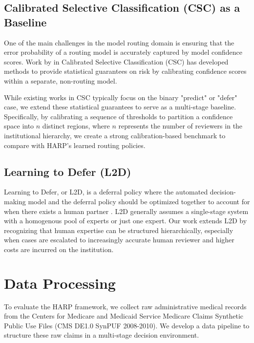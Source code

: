 \documentclass[conference]{IEEEtran}
\begin{document}
\subsection{Calibrated Selective Classification (CSC) as a Baseline}

One of the main challenges in the model routing domain is ensuring that the error probability of a routing model is
accurately captured by model confidence scores. Work by \cite{fisch2024,angelopoulos2022} in Calibrated Selective Classification (CSC)
has developed methods to provide statistical guarantees on risk by calibrating confidence scores within a separate,
non-routing model.

While existing works in CSC typically focus on the binary "predict" or "defer" case, we extend these statistical
guarantees to serve as a multi-stage baseline. Specifically, by calibrating a sequence of thresholds to partition 
a confidence space into $n$ distinct regions, where $n$ represents the number of reviewers in the institutional hierarchy,
we create a strong calibration-based benchmark to compare with HARP's learned routing policies.

\subsection{Learning to Defer (L2D)}

Learning to Defer, or L2D, is a deferral policy where the automated decision-making model and the deferral 
policy should be optimized together to account for when there exists a human partner \cite{madras2018}. L2D generally assumes
a single-stage system with a homogenous pool of experts \cite{mozannar2021} or just one expert. Our work extends L2D by recognizing
that human expertise can be structured hierarchically, especially when cases are escalated to increasingly
accurate human reviewer and higher costs are incurred on the institution.



\section{Data Processing}

To evaluate the HARP framework, we collect raw administrative
medical records from the Centers for Medicare and Medicaid 
Service Medicare Claims Synthetic Public Use Files (CMS DE1.0 SynPUF 2008-2010).
We develop a data pipeline to structure these raw claims in a multi-stage
decision environment.
\end{document}
